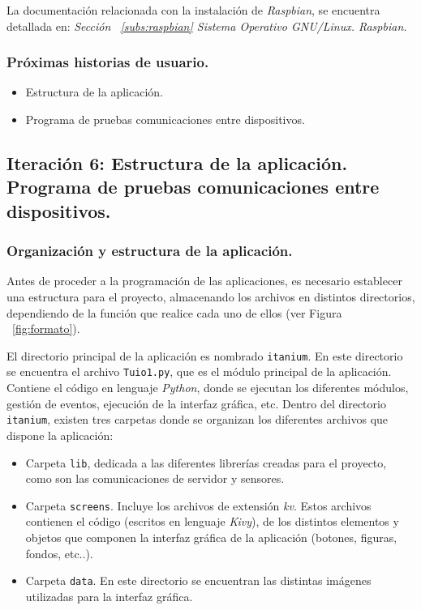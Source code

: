 La documentación relacionada con la instalación de \emph{Raspbian}, se encuentra detallada en: \emph{Sección ~\ref{subs:raspbian} Sistema Operativo GNU/Linux. Raspbian.}


\subsubsection{Próximas historias de usuario.}
\begin{itemize}
\item Estructura de la aplicación.
\item Programa de pruebas comunicaciones entre dispositivos.
\end{itemize}


\subsection{Iteración 6: Estructura de la aplicación. Programa de pruebas comunicaciones entre dispositivos.}

\subsubsection{Organización y estructura de la aplicación.}

Antes de proceder a la programación de las aplicaciones, es necesario establecer una estructura para el proyecto, almacenando los archivos en distintos directorios, dependiendo de la función que realice cada uno de ellos (ver Figura ~\ref{fig:formato}).

El directorio principal de la aplicación es nombrado \texttt{itanium}. En este directorio se encuentra el archivo \texttt{Tuio1.py}, que es el módulo principal de la aplicación. Contiene el código en lenguaje \emph{Python}, donde se ejecutan los diferentes módulos, gestión de eventos, ejecución de la interfaz gráfica, etc. Dentro del directorio \texttt{itanium}, existen tres carpetas donde se organizan los diferentes archivos que dispone la aplicación:
\begin{itemize}
\item Carpeta \texttt{lib}, dedicada a las diferentes librerías creadas para el proyecto, como son las comunicaciones de servidor y sensores.
\item Carpeta \texttt{screens}. Incluye los archivos de extensión \emph{kv}. Estos archivos contienen el código (escritos en lenguaje \emph{Kivy}), de los distintos elementos y objetos que componen la interfaz gráfica de la aplicación (botones, figuras, fondos, etc..).
\item Carpeta \texttt{data}. En este directorio se encuentran las distintas imágenes utilizadas para la interfaz gráfica.
\end{itemize}


